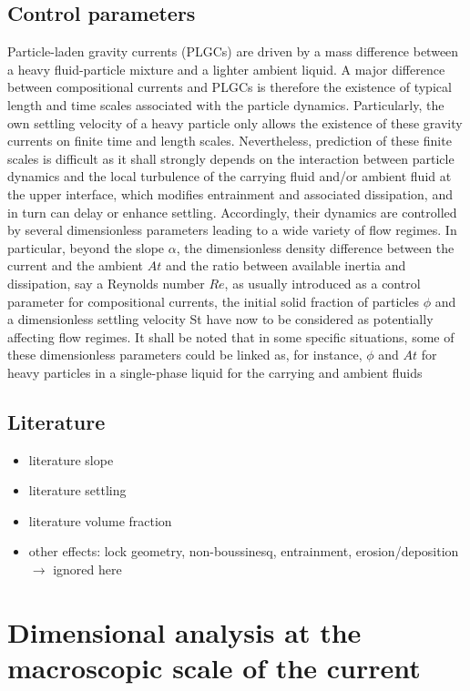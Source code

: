 \documentclass[twocolumn]{article}
\begin{document}
\subsection{Control parameters}

Particle-laden gravity currents (PLGCs) are driven by a mass difference between a heavy fluid-particle mixture and a lighter ambient liquid. A major difference between compositional currents and PLGCs is therefore the existence of typical length and time scales associated with the particle dynamics. Particularly, the own settling velocity of a heavy particle only allows the existence of these gravity currents on finite time and length scales. Nevertheless, prediction of these finite scales is difficult as it shall strongly depends on the interaction between particle dynamics and the local turbulence of the carrying fluid and/or ambient fluid at the upper interface, which modifies entrainment and associated dissipation, and in turn can delay or enhance settling. Accordingly, their dynamics are controlled by several dimensionless parameters leading to a wide variety of flow regimes. In particular, beyond the slope $\alpha$, the dimensionless density difference between the current and the ambient $At$ and the ratio between available inertia and dissipation, say a Reynolds number $Re$, as usually introduced as a control parameter for compositional currents, the initial solid fraction of particles $\phi$ and a dimensionless settling velocity St have now to be considered as potentially affecting flow regimes. It shall be noted that in some specific situations, some of these dimensionless parameters could be linked as, for instance, $\phi$ and $At$ for heavy particles in a single-phase liquid for the carrying and ambient fluids

\subsection{Literature}


\begin{itemize}
	\item literature slope
	\item literature settling
	\item literature volume fraction
	\item other effects: lock geometry, non-boussinesq, entrainment, erosion/deposition $\rightarrow$ ignored here
\end{itemize}

\section{Dimensional analysis at the macroscopic scale of the current}
\label{sec:dimensionlessmap}
\end{document}
